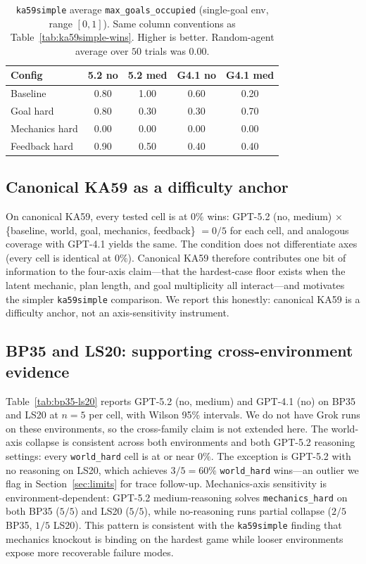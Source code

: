 \documentclass{article}
\begin{document}
\begin{table}[t]
  \small
  \setlength{\tabcolsep}{4pt}
  \caption{\texttt{ka59simple} average \texttt{max\_goals\_occupied} (single-goal env, range $[0, 1]$). Same column conventions as Table~\ref{tab:ka59simple-wins}. Higher is better. Random-agent average over $50$ trials was $0.00$.}
  \label{tab:ka59simple-progress}
  \centering
  \begin{tabular}{lcccc}
    \toprule
    Config & 5.2 no & 5.2 med & G4.1 no & G4.1 med \\
    \midrule
    Baseline       & 0.80 & 1.00 & 0.60 & 0.20 \\
    Goal hard      & 0.80 & 0.30 & 0.30 & 0.70 \\
    Mechanics hard & 0.00 & 0.00 & 0.00 & 0.00 \\
    Feedback hard  & 0.90 & 0.50 & 0.40 & 0.40 \\
    \bottomrule
  \end{tabular}
\end{table}

\subsection{Canonical KA59 as a difficulty anchor}
On canonical KA59, every tested cell is at $0\%$ wins: GPT-5.2 (no, medium) $\times$ \{baseline, world, goal, mechanics, feedback\} $= 0/5$ for each cell, and analogous coverage with GPT-4.1 yields the same. The condition does not differentiate axes (every cell is identical at $0\%$). Canonical KA59 therefore contributes one bit of information to the four-axis claim---that the hardest-case floor exists when the latent mechanic, plan length, and goal multiplicity all interact---and motivates the simpler \texttt{ka59simple} comparison. We report this honestly: canonical KA59 is a difficulty anchor, not an axis-sensitivity instrument.

\subsection{BP35 and LS20: supporting cross-environment evidence}
\label{sec:bp35-ls20}
Table~\ref{tab:bp35-ls20} reports GPT-5.2 (no, medium) and GPT-4.1 (no) on BP35 and LS20 at $n=5$ per cell, with Wilson 95\% intervals. We do not have Grok runs on these environments, so the cross-family claim is not extended here. The world-axis collapse is consistent across both environments and both GPT-5.2 reasoning settings: every \texttt{world\_hard} cell is at or near $0\%$. The exception is GPT-5.2 with no reasoning on LS20, which achieves $3/5 = 60\%$ \texttt{world\_hard} wins---an outlier we flag in Section~\ref{sec:limits} for trace follow-up. Mechanics-axis sensitivity is environment-dependent: GPT-5.2 medium-reasoning solves \texttt{mechanics\_hard} on both BP35 ($5/5$) and LS20 ($5/5$), while no-reasoning runs partial collapse ($2/5$ BP35, $1/5$ LS20). This pattern is consistent with the \texttt{ka59simple} finding that mechanics knockout is binding on the hardest game while looser environments expose more recoverable failure modes.
\end{document}

